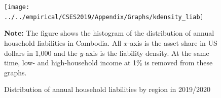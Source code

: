 \documentclass[11pt,letterpaper]{article}
\begin{document}
\begin{figure}[]
	\centering
	\caption{Distribution of annual household liabilities by region in 2019/2020}
	\label{}
	\texttt{[image: ../../empirical/CSES2019/Appendix/Graphs/kdensity\_liab]}
	\begin{tablenotes}
		\footnotesize
		\item \textbf{Note:} The figure shows the histogram of the distribution of annual household liabilities in Cambodia. All $x$-axis is the asset share in US dollars in 1,000 and the $y$-axis is the liability density. At the same time, low- and high-household income at 1\% is removed from these graphs. 
	\end{tablenotes} 
\end{figure}
\end{document}
